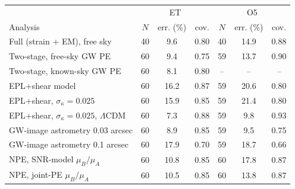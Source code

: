 \begin{tabular*}{\linewidth}{@{\extracolsep{\fill}}lcccccc@{}}
\toprule
 & \multicolumn{3}{c}{ET} & \multicolumn{3}{c}{O5} \\
Analysis & $N$ & err. (\%) & cov. & $N$ & err. (\%) & cov. \\
\midrule
Full (strain + EM), free sky & 40 & 9.6 & 0.80 & 40 & 14.9 & 0.88 \\
Two-stage, free-sky GW PE & 60 & 9.4 & 0.75 & 59 & 13.7 & 0.90 \\
Two-stage, known-sky GW PE & 60 & 8.1 & 0.80 & -- & -- & -- \\
\quad EPL+shear model & 60 & 16.2 & 0.87 & 59 & 20.6 & 0.80 \\
\quad EPL+shear, $\sigma_{\kappa}=0.025$ & 60 & 15.9 & 0.85 & 59 & 21.4 & 0.80 \\
\quad EPL+shear, $\sigma_{\kappa}=0.025$, $\Lambda$CDM & 60 & 7.3 & 0.88 & 59 & 9.8 & 0.93 \\
\quad GW-image astrometry 0.03 arcsec & 60 & 8.9 & 0.85 & 59 & 9.5 & 0.75 \\
\quad GW-image astrometry 0.1 arcsec & 60 & 17.9 & 0.70 & 59 & 18.7 & 0.66 \\
NPE, SNR-model $\mu_B/\mu_A$ & 60 & 10.8 & 0.85 & 60 & 17.8 & 0.87 \\
NPE, joint-PE $\mu_B/\mu_A$ & 60 & 10.5 & 0.85 & 60 & 13.8 & 0.87 \\
\bottomrule
\end{tabular*}
